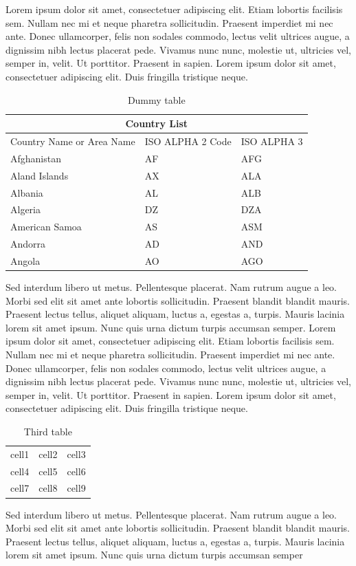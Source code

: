 \documentclass{article}
\begin{document}
Lorem ipsum dolor sit amet, consectetuer adipiscing elit. Etiam lobortis
facilisis sem. Nullam nec mi et neque pharetra sollicitudin. Praesent imperdiet
mi nec ante. Donec ullamcorper, felis non sodales commodo, lectus velit ultrices
augue, a dignissim nibh lectus placerat pede. Vivamus nunc nunc, molestie
ut, ultricies vel, semper in, velit. Ut porttitor. Praesent in sapien. Lorem
ipsum dolor sit amet, consectetuer adipiscing elit. Duis fringilla tristique neque.

\begin{table}[h]
\centering
\begin{tabular}{ | p{3cm} | p{3cm} | p{3cm} |  }
 \hline
 \multicolumn{3}{|c|}{Country List} \\
 \hline
 Country Name	 or Area Name& ISO ALPHA 2 Code	&ISO ALPHA 3 \\
 \hline
 Afghanistan & AF &AFG \\
 Aland Islands & AX	& ALA \\
 Albania	&AL	& ALB \\
 Algeria	&DZ	& DZA \\
 American Samoa & AS & ASM \\
 Andorra & AD & AND	\\
 Angola & AO & AGO \\
 \hline
 \end{tabular}
\caption{Dummy table}
\label{tab:table2}
\end{table}

Sed interdum libero ut metus. Pellentesque placerat. Nam rutrum augue a
leo. Morbi sed elit sit amet ante lobortis sollicitudin. Praesent blandit blandit
mauris. Praesent lectus tellus, aliquet aliquam, luctus a, egestas a, turpis.
Mauris lacinia lorem sit amet ipsum. Nunc quis urna dictum turpis accumsan
semper.
Lorem ipsum dolor sit amet, consectetuer adipiscing elit. Etiam lobortis
facilisis sem. Nullam nec mi et neque pharetra sollicitudin. Praesent imperdiet
mi nec ante. Donec ullamcorper, felis non sodales commodo, lectus velit ultrices
augue, a dignissim nibh lectus placerat pede. Vivamus nunc nunc, molestie
ut, ultricies vel, semper in, velit. Ut porttitor. Praesent in sapien. Lorem
ipsum dolor sit amet, consectetuer adipiscing elit. Duis fringilla tristique neque.

\begin{table}[]
\centering
\begin{tabular}{ | c | c | c | } 
  \hline
  cell1 & cell2 & cell3 \\ 
  cell4 & cell5 & cell6 \\ 
  cell7 & cell8 & cell9 \\ 
  \hline
\end{tabular}
\caption{Third table}
\label{tab:table3}
\end{table}

Sed interdum libero ut metus. Pellentesque placerat. Nam rutrum augue a
leo. Morbi sed elit sit amet ante lobortis sollicitudin. Praesent blandit blandit
mauris. Praesent lectus tellus, aliquet aliquam, luctus a, egestas a, turpis.
Mauris lacinia lorem sit amet ipsum. Nunc quis urna dictum turpis accumsan
semper
\end{document}
